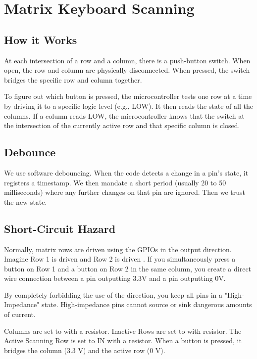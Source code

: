 \documentclass[12pt]{article}
\begin{document}
	
	\newpage
	\pagestyle{fancy}
	\fancyhf{}
	\cfoot{\thepage}
	
	\section{Matrix Keyboard Scanning}
	\subsection{How it Works}
	At each intersection of a row and a column, there is a push-button switch. When open, the row and column are physically disconnected. When pressed, the switch bridges the specific row and column together.
	
	To figure out which button is pressed, the microcontroller tests one row at a time by driving it to a specific logic level (e.g., LOW). It then reads the state of all the columns. If a column reads LOW, the microcontroller knows that the switch at the intersection of the currently active row and that specific column is closed.
	
	\subsection{Debounce}
	We use software debouncing. When the code detects a change in a pin's state, it registers a timestamp. We then mandate a short period (usually 20 to 50 milliseconds) where any further changes on that pin are ignored. Then we trust the new state.
	
	\subsection{Short-Circuit Hazard}
	Normally, matrix rows are driven using the GPIOs in the output direction. Imagine Row 1 is driven  and Row 2 is driven . If you simultaneously press a button on Row 1 and a button on Row 2 in the same column, you create a direct wire connection between a pin outputting 3.3V and a pin outputting 0V.
	
	By completely forbidding the use of the  direction, you keep all pins in a "High-Impedance" state. High-impedance pins cannot source or sink dangerous amounts of current. 
	
	
	Columns are set to  with a  resistor.
	Inactive Rows are set to  with  resistor.
	The Active Scanning Row is set to IN with a  resistor.
	When a button is pressed, it bridges the column (3.3 V) and the active row (0 V).
	
\end{document}

